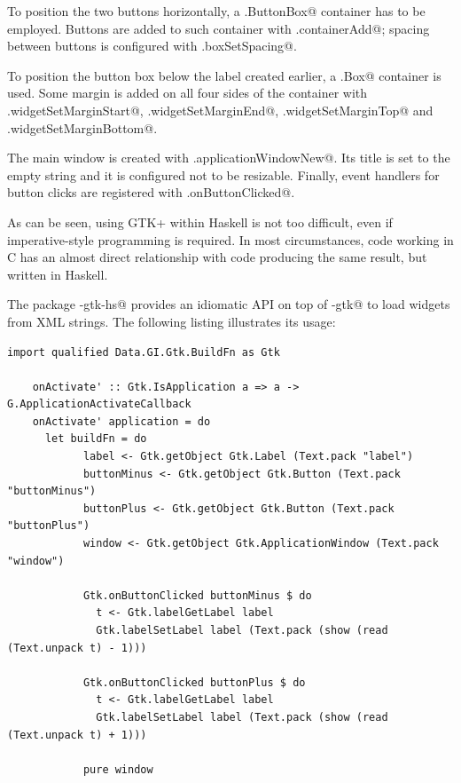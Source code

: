 \documentclass[UdineBachThesis,american,11pt]{PhdThesis}
\begin{document}
  To position the two buttons horizontally, a \lstinline@Gtk.ButtonBox@
  container has to be employed. Buttons are added to such container with
  \lstinline@Gtk.containerAdd@; spacing between buttons is configured with
  \lstinline@Gtk.boxSetSpacing@.

  To position the button box below the label created earlier, a
  \lstinline@Gtk.Box@ container is used. Some margin is added on all four sides
  of the container with \lstinline@Gtk.widgetSetMarginStart@,
  \lstinline@Gtk.widgetSetMarginEnd@, \lstinline@Gtk.widgetSetMarginTop@ and
  \lstinline@Gtk.widgetSetMarginBottom@.

  The main window is created with \lstinline@Gtk.applicationWindowNew@. Its
  title is set to the empty string and it is configured not to be resizable.
  Finally, event handlers for button clicks are registered with
  \lstinline@Gtk.onButtonClicked@.

  As can be seen, using GTK+ within Haskell is not too difficult, even if
  imperative-style programming is required. In most circumstances, code working
  in C has an almost direct relationship with code producing the same result,
  but written in Haskell.

  The package \lstinline@gi-gtk-hs@ provides an idiomatic API on top of
  \lstinline@gi-gtk@ to load widgets from XML strings. The following listing
  illustrates its usage:

  \begin{lstlisting}[gobble=4,basicstyle=\ttfamily\small]
    import qualified Data.GI.Gtk.BuildFn as Gtk

    onActivate' :: Gtk.IsApplication a => a -> G.ApplicationActivateCallback
    onActivate' application = do
      let buildFn = do
            label <- Gtk.getObject Gtk.Label (Text.pack "label")
            buttonMinus <- Gtk.getObject Gtk.Button (Text.pack "buttonMinus")
            buttonPlus <- Gtk.getObject Gtk.Button (Text.pack "buttonPlus")
            window <- Gtk.getObject Gtk.ApplicationWindow (Text.pack "window")

            Gtk.onButtonClicked buttonMinus $ do
              t <- Gtk.labelGetLabel label
              Gtk.labelSetLabel label (Text.pack (show (read (Text.unpack t) - 1)))

            Gtk.onButtonClicked buttonPlus $ do
              t <- Gtk.labelGetLabel label
              Gtk.labelSetLabel label (Text.pack (show (read (Text.unpack t) + 1)))

            pure window
  \end{lstlisting}
\end{document}
